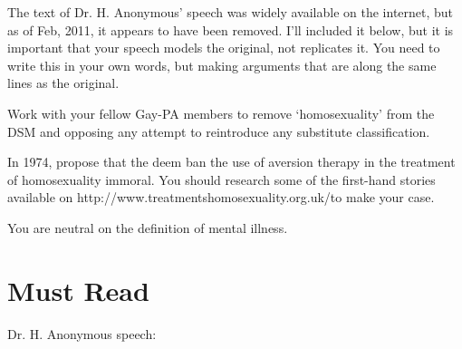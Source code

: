 The text of Dr. H. Anonymous' speech was widely available on the internet, but as of Feb, 2011, it appears to have been removed. I'll included it below, but it is important that your speech models the original, not replicates it. You need to write this in your own words, but making arguments that are along the same lines as the original.

Work with your fellow Gay-PA members to remove `homosexuality' from the DSM and opposing any attempt to reintroduce any substitute classification.

In 1974, propose that the deem ban the use of aversion therapy in the treatment of homosexuality immoral. You should research some of the first-hand stories available on http:\slash \slash www.treatmentshomosexuality.org.uk\slash  to make your case.

You are neutral on the definition of mental illness. 

\section{Must Read}
\label{mustread}

Dr. H. Anonymous speech:

